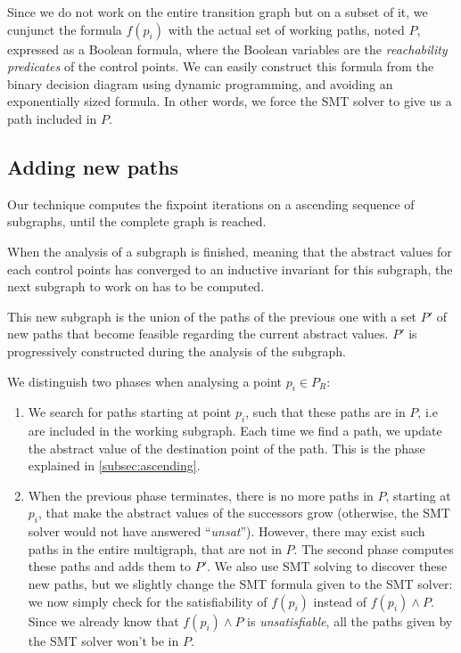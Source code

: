 \documentclass[preprint]{sigplanconf}
\begin{document}
Since we do not work on the entire transition graph but on a subset of it, we
cunjunct the formula $f(p_i)$ with the actual set of working paths,
noted $P$, expressed as a Boolean formula, where the Boolean variables are the
\emph{reachability predicates} of the control points. We can easily construct
this formula from the binary decision diagram using dynamic programming, and
avoiding an exponentially sized formula. In other words, we force the SMT solver
to give us a path included in $P$.


\subsection{Adding new paths}
\label{subsec:addingpaths}

Our technique computes the fixpoint iterations on a ascending sequence of
subgraphs, until the complete graph is reached.

When the analysis of a subgraph is finished, meaning that the abstract values
for each control points has converged to an inductive invariant for this subgraph,
the next subgraph to work on has to be computed.

This new subgraph is the union of the paths of the previous one with a set
$P'$ of new paths that become feasible regarding the current abstract values.
$P'$ is progressively constructed during the analysis of the subgraph.

We distinguish two phases when analysing a point $p_i \in P_R$:
\begin{enumerate}
\item We search for paths starting at point $p_i$, such that these paths are in
$P$, i.e are included in the working subgraph. Each time we find a path, we
update the abstract value of the destination point of the path. This is the
phase explained in \ref{subsec:ascending}.
\item  When the previous phase terminates, there is no more paths in
$P$, starting at $p_i$, 
that make the abstract values of the successors grow (otherwise, the SMT
solver would not have answered ``\emph{unsat}''). However, there may
exist such paths in the entire multigraph, that are not in $P$. The second phase
computes these paths and adds them to $P'$. We also use SMT solving to discover
these new paths, but we slightly change the SMT formula given to the SMT solver:
we now simply check for the satisfiability of $f(p_i)$ instead of $f(p_i) \wedge
P$. Since we already know that $f(p_i) \wedge P$ is \emph{unsatisfiable}, all
the paths given by the SMT solver won't be in $P$.
\end{enumerate}
\end{document}
